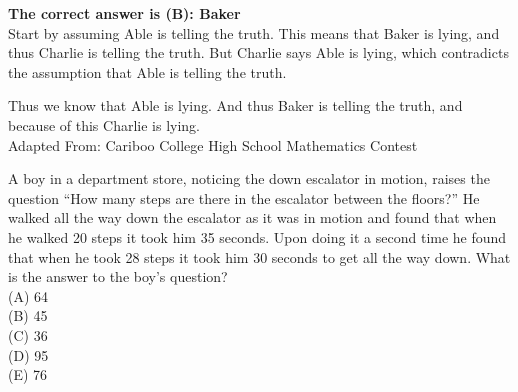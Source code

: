 \documentclass{article}
\begin{document}

\textbf{The correct answer is (B): Baker}\\[1 ex]
Start by assuming Able is telling the truth. This means that Baker is lying, and thus Charlie is telling the truth. But Charlie says Able is lying, which contradicts the assumption that Able is telling the truth.

Thus we know that Able is lying. And thus Baker is telling the truth, and because of this Charlie is lying.
\\[5 ex]

\scriptsize
Adapted From: Cariboo College High School Mathematics Contest

\normalsize
A boy in a department store, noticing the down escalator in motion, raises the question ``How many steps are there in the escalator between the floors?'' He walked all the way down the escalator as it was in motion and found that when he walked 20 steps it took him 35 seconds. Upon doing it a second time he found that when he took 28 steps it took him 30 seconds to get all the way down. What is the answer to the boy's question?\\
(A) 64\\
(B) 45\\
(C) 36\\
(D) 95\\
(E) 76\\

\end{document}
